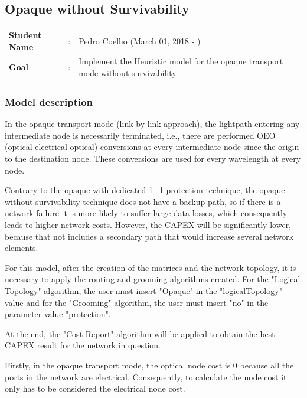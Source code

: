 \clearpage

\subsection{Opaque without Survivability}\label{heuristic_Opaque_Survivability}
\begin{tcolorbox}	
\begin{tabular}{p{2.75cm} p{0.2cm} p{10.5cm}} 	
\textbf{Student Name}  &:& Pedro Coelho    (March 01, 2018 - )\\
\textbf{Goal}          &:& Implement the Heuristic model for the opaque transport mode without survivability.
\end{tabular}
\end{tcolorbox}

\subsubsection{Model description}
\vspace{11pt}
In the opaque transport mode (link-by-link approach), the lightpath entering any intermediate node is necessarily terminated, i.e., there are performed OEO (optical-electrical-optical) conversions at every intermediate node since the origin to the destination node. These conversions are used for every wavelength at every node.

Contrary to the opaque with dedicated 1+1 protection technique, the opaque without survivability technique does not have a backup path, so if there is a network failure it is more likely to suffer large data losses, which consequently leads to higher network costs. However, the CAPEX will be significantly lower, because that not includes a secondary path that would increase several network elements.

For this model, after the creation of the matrices and the network topology, it is necessary to apply the routing and grooming algorithms created. For the "Logical Topology" algorithm, the user must insert "Opaque" in the "logicalTopology" value and for the "Grooming" algorithm, the user must insert "no" in the parameter value "protection".

At the end, the "Cost Report" algorithm will be applied to obtain the best CAPEX result for the network in question.

Firstly, in the opaque transport mode, the optical node cost is 0 because all the ports in the network are electrical. Consequently, to calculate the node cost it only has to be considered the electrical node cost.

